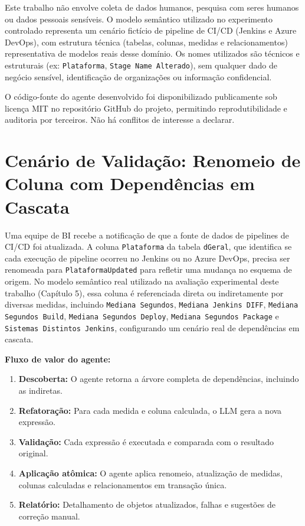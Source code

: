 \documentclass[
    12pt,               %
    openright,          %
    oneside,            %
    a4paper,            %
    chapter=TITLE,      %
    section=TITLE,      %
    brazil              %
]{abntex2}
\begin{document}
Este trabalho não envolve coleta de dados humanos, pesquisa com seres humanos ou dados pessoais sensíveis. O modelo semântico utilizado no experimento controlado representa um cenário fictício de pipeline de CI/CD (Jenkins e Azure DevOps), com estrutura técnica (tabelas, colunas, medidas e relacionamentos) representativa de modelos reais desse domínio. Os nomes utilizados são técnicos e estruturais (ex: \texttt{Plataforma}, \texttt{Stage Name Alterado}), sem qualquer dado de negócio sensível, identificação de organizações ou informação confidencial.

O código-fonte do agente desenvolvido foi disponibilizado publicamente sob licença MIT no repositório GitHub do projeto, permitindo reprodutibilidade e auditoria por terceiros. Não há conflitos de interesse a declarar.

\section{Cenário de Validação: Renomeio de Coluna com Dependências em Cascata}

Uma equipe de BI recebe a notificação de que a fonte de dados de pipelines de CI/CD foi atualizada. A coluna \texttt{Plataforma} da tabela \texttt{dGeral}, que identifica se cada execução de pipeline ocorreu no Jenkins ou no Azure DevOps, precisa ser renomeada para \texttt{PlataformaUpdated} para refletir uma mudança no esquema de origem. No modelo semântico real utilizado na avaliação experimental deste trabalho (Capítulo 5), essa coluna é referenciada direta ou indiretamente por diversas medidas, incluindo \texttt{Mediana Segundos}, \texttt{Mediana Jenkins DIFF}, \texttt{Mediana Segundos Build}, \texttt{Mediana Segundos Deploy}, \texttt{Mediana Segundos Package} e \texttt{Sistemas Distintos Jenkins}, configurando um cenário real de dependências em cascata.

\textbf{Fluxo de valor do agente:}
\begin{enumerate}
    \item \textbf{Descoberta:} O agente retorna a árvore completa de dependências, incluindo as indiretas.
    \item \textbf{Refatoração:} Para cada medida e coluna calculada, o LLM gera a nova expressão.
    \item \textbf{Validação:} Cada expressão é executada e comparada com o resultado original.
    \item \textbf{Aplicação atômica:} O agente aplica renomeio, atualização de medidas, colunas calculadas e relacionamentos em transação única.
    \item \textbf{Relatório:} Detalhamento de objetos atualizados, falhas e sugestões de correção manual.
\end{enumerate}
\end{document}
